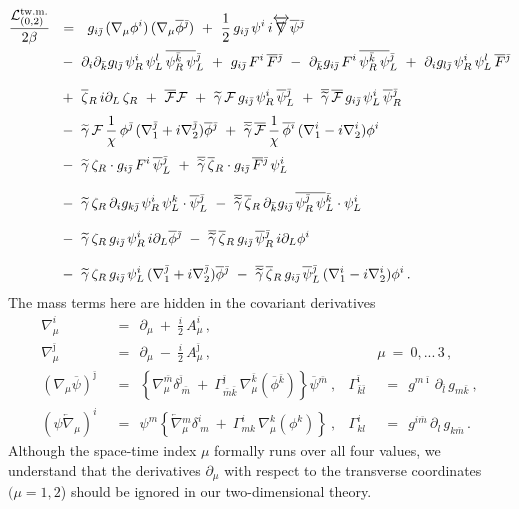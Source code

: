 \documentclass[12pt]{article}
\newcommand{\p}{\partial}
\newcommand{\wt}{\widetilde}
\newcommand{\ov}{\overline}
\newcommand{\mc}[1]{\mathcal{#1}}
\def\slashed#1{\setbox0=\hbox{$#1$}             %
   \dimen0=\wd0                                 %
   \setbox1=\hbox{/} \dimen1=\wd1               %
   \ifdim\dimen0>\dimen1                        %
      \rlap{\hbox to \dimen0{\hfil/\hfil}}      %
      #1                                        %
   \else                                        %
      \rlap{\hbox to \dimen1{\hfil$#1$\hfil}}   %
      /                                         %
   \fi}                                        %
\newcommand{\bzr}{\ov{\zeta}{}_R}
\newcommand{\zr}{\zeta_R}
\newcommand{\tgamma}{\wt{\gamma}}
\newcommand{\btgamma}{\ov{\tgamma}}
\newcommand{\bpsi}{\ov{\psi}{}}
\newcommand{\bphi}{\ov{\phi}{}}
\newcommand{\ff}{\mc{F}}
\newcommand{\bff}{\ov{\mc{F}}}
\newcommand{\bi}{{\bar \imath}}
\newcommand{\bj}{{\bar \jmath}}
\newcommand{\bk}{{\bar k}}
\newcommand{\bl}{{\bar l}}
\newcommand{\bm}{{\bar m}}
\begin{document}
\begin{align}
%
\notag
	\frac{\mc{L}_{(0,2)}^\text{tw.m.}}{2\beta} & ~~=~~ 
	g_{i\bj}\,(\nabla_\mu \phi^i)\, (\nabla_\mu\ov{\phi}{}^\bj)
	~+~ \frac{1}{2}\, g_{i\bj}\, \psi^i\, i\overleftrightarrow{\slashed{\nabla}} \ov{\psi}{}^\bj
	\\
%
\notag
	&~
	~-~ \p_i\p_\bk g_{l\bj}\, \psi^i_{R}\, \psi^l_{L}\, \ov{\psi^\bk_{R}\, \psi}{}^\bj_{L}
	~+~ g_{i\bj}\, F^i\,\ov{F}{}^\bj
	~-~ \p_\bk g_{i\bj}\, F^i\, \ov{\psi_R^\bk\, \psi}{}_L^\bj
	~+~ \p_i g_{l\bj}\, \psi_R^i\, \psi_L^l\, \ov{F}{}^\bj
	\\[3mm]
%
\notag
	&~
	~+~ \bzr\, i\p_L\, \zr ~+~ \bff \ff 
	~+~ \tgamma\, \ff\, g_{i\bj}\, \psi_R^i\, \bpsi_L^\bj 
	~+~ \btgamma\, \bff\, g_{i\bj}\, \psi_L^i\, \bpsi_R^\bj
	\\[1mm]
%
\label{geomlin}
	&~
	~-~ \tgamma\, \ff\, \frac{1}{\chi}\,\phi^\bj\, (\nabla_1^\bj + i \nabla_2^\bj) \bphi^\bj
	~+~ \btgamma\, \bff\, \frac{1}{\chi}\,\bphi^\bi\, (\nabla_1^i - i \nabla_2^i) \phi^i
	\\[1mm]
%
\notag
	&~
	~-~ \tgamma\,\zr\cdot g_{i\bj}\, F^i\, \bpsi_L^\bj
	~+~ \btgamma\, \bzr\cdot g_{i\bj}\, \ov{F}{}^\bj\, \psi_L^i
	\\[3mm]
%
\notag
	&~
	~-~ \tgamma\, \zr\, \p_i g_{k\bj}\, \psi_R^i\, \psi_L^k \cdot \bpsi_L^\bj
	~-~ \btgamma\, \bzr\, \p_\bk g_{i\bj}\, \ov{\psi_R^\bj\, \psi}{}_L^\bk \cdot \psi_L^i
	\\[3mm]
%	
\notag
	&~
	~-~ \tgamma\, \zr\, g_{i\bj}\, \psi_R^i\, i\p_L \bphi^\bj
	~-~ \btgamma\, \bzr\, g_{i\bj}\, \bpsi_R^\bj\, i\p_L \phi^i
	\\[3mm]
%
\notag
	&~
	~-~ \tgamma\, \zr\, g_{i\bj}\, \psi_L^i\, (\nabla_1^\bj + i\nabla_2^\bj) \bphi^\bj
	~-~ \btgamma\, \bzr\, g_{i\bj}\, \bpsi_L^\bj\, (\nabla_1^i - i\nabla_2^i) \phi^i
	\,.
\end{align}
	The mass terms here are hidden in the covariant derivatives
\begin{align*}
%
	\nabla_\mu^i & ~~=~~ \p_\mu ~+~ \frac{i}{2}\,A_\mu^i\,,  \\[3mm]
%
	\nabla_\mu^\bj & ~~=~~ \p_\mu ~-~ \frac{i}{2}\,A_\mu^\bj \,,
	&& \!\!\!\!\!\!\! \mu ~=~ 0,...\,3\,,
	\\[3mm]
%
	(\nabla_\mu \ov{\psi})^\bj & ~~=~~ \left\{ \nabla_\mu^\bm \delta^\bj_{\ \bm} ~+~
						\Gamma_{\bm\bk}^\bj\, \nabla_\mu^\bk (\ov{\phi}{}^\bk) \right\} \ov{\psi}{}^\bm~,
	& \Gamma^\bi_{\bk\bl} & ~~=~~ g^{m\bi}\,\p_\bl\, g_{m\bk}~,
	\\[3mm]
%
	(\psi \overleftarrow{\nabla}{}_\mu)^i & ~~=~~ 
			\psi^m \left\{ \overleftarrow{\nabla}{}_\mu^m \delta^i_{\ m} ~+~
						\Gamma^i_{mk}\, \nabla_\mu^k (\phi^k) \right\}~,
	& \Gamma^i_{kl} & ~~=~~ g^{i\bm}\, \p_l\, g_{k\bm}\,.
\end{align*}
	Although the space-time index $\mu$ formally runs over all four values, we understand
	that the derivatives $ \p_\mu $ with respect to the transverse coordinates 
	$(\mu=1,2$) should be ignored in our two-dimensional
	theory.
\end{document}
